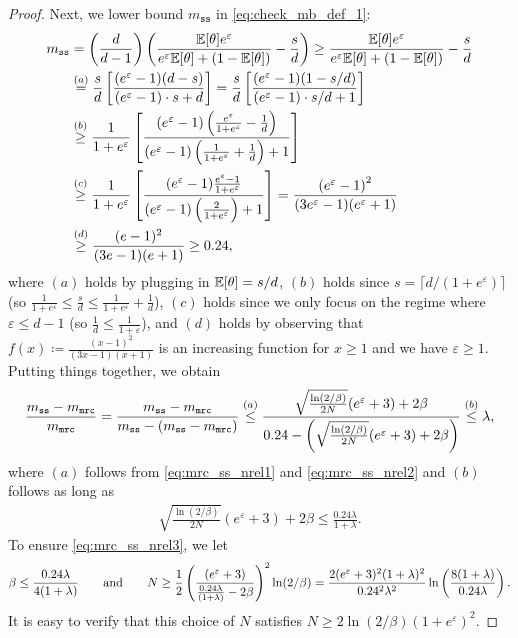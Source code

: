 \begin{proof}
Next, we lower bound $m_{\texttt{ss}}$ in \eqref{eq:check_mb_def_1}:
\begin{align}
    m_{\texttt{ss}} & = \left(\frac{d}{d-1}\right)\left( \frac{\mathbb{E}[\theta]e^\varepsilon}{e^\varepsilon \mathbb{E}[\theta]+(1-\mathbb{E}[\theta])} - \frac{s}{d} \right)  \geq \frac{\mathbb{E}[\theta]e^\varepsilon}{e^\varepsilon \mathbb{E}[\theta]+(1-\mathbb{E}[\theta])} - \frac{s}{d}\\
    &\stackrel{(a)}{=}\frac{s}{d}\left[ \frac{(e^\varepsilon-1)(d-s)}{(e^\varepsilon-1)\cdot s +d} \right] =\frac{s}{d}\left[ \frac{(e^\varepsilon-1)(1-s/d)}{(e^\varepsilon-1)\cdot s/d +1} \right] \\
    & \stackrel{(b)}{\geq} \frac{1}{1+e^\varepsilon}\left[ \frac{(e^\varepsilon-1)\left(\frac{e^\varepsilon}{1+e^\varepsilon}-\frac{1}{d}\right)}{(e^\varepsilon-1)\left(\frac{1}{1+e^\varepsilon}+\frac{1}{d}\right)+1} \right] \\
    & \stackrel{(c)}{\geq} \frac{1}{1+e^\varepsilon}\left[ \frac{(e^\varepsilon-1)\frac{e^\varepsilon-1}{1+e^\varepsilon}}{(e^\varepsilon-1)\left(\frac{2}{1+e^\varepsilon}\right)+1} \right] = \frac{\left( e^\varepsilon-1\right)^2}{(3e^\varepsilon-1)(e^\varepsilon+1)} \\
    &\stackrel{(d)}{\geq} \frac{(e-1)^2}{(3e-1)(e+1)} \geq 0.24, \label{eq:mrc_ss_nrel2}
\end{align}
where $(a)$ holds by plugging in $\mathbb{E}[\theta] = s/d$, $(b)$ holds since $s = \lceil d/(1+e^\varepsilon)\rceil$ (so $\frac{1}{1+e^\varepsilon} \leq \frac{s}{d} \leq \frac{1}{1+e^\varepsilon}+\frac{1}{d}$), $(c)$ holds since we only focus on the regime where $\varepsilon \leq d-1$ (so $\frac{1}{d} \leq \frac{1}{1+\varepsilon}$), and $(d)$ holds by observing that $f(x) \coloneqq \frac{(x-1)^2}{(3x-1)(x+1)}$ is an increasing function for $x \geq 1$ and we have $\varepsilon \geq 1$. Putting things together, we obtain
\begin{align}
    \frac{m_{\texttt{ss}}-m_{\texttt{mrc}}}{m_{\texttt{mrc}}} =  \frac{m_{\texttt{ss}}-m_{\texttt{mrc}}}{m_{\texttt{ss}}-(m_{\texttt{ss}}-m_{\texttt{mrc}})} \stackrel{(a)}{\leq} \frac{\sqrt{\frac{\ln(2/\beta)}{2N}}(e^\varepsilon+3)+2\beta}{0.24-\left( \sqrt{\frac{\ln(2/\beta)}{2N}}(e^\varepsilon+3)+2\beta \right)} \stackrel{(b)}{\leq} \lambda,
\end{align}
where $(a)$ follows from \eqref{eq:mrc_ss_nrel1} and \eqref{eq:mrc_ss_nrel2} and $(b)$ follows as long as
\begin{align}
    \sqrt{\frac{\ln(2/\beta)}{2N}}(e^\varepsilon+3)+2\beta \leq \frac{0.24 \lambda}{1+\lambda}. \label{eq:mrc_ss_nrel3}
\end{align}
To ensure \eqref{eq:mrc_ss_nrel3}, we let
\begin{align*}
    \beta \leq \frac{0.24\lambda}{4(1+\lambda)} \qquad \text{and} \qquad N \geq \frac{1}{2}\left(\frac{(e^\varepsilon+3)}{\frac{0.24\lambda}{(1+\lambda)}-2\beta}\right)^2\ln(2/\beta) = \frac{2(e^{\varepsilon}+3)^2(1+\lambda)^2}{0.24^2\lambda^2}\ln\left( \frac{8(1+\lambda)}{0.24\lambda}\right).
\end{align*}
It is easy to verify that this choice of $N$ satisfies $ N \geq 2\ln(2/\beta)(1+e^\varepsilon)^2 $.
\end{proof}


